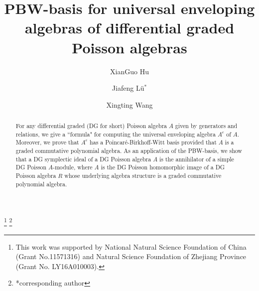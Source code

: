 \documentclass[a4paper,10pt]{amsart}
\theoremstyle{definition}
\theoremstyle{remark}
\numberwithin{equation}{section}
\begin{document}
\title{PBW-basis for universal enveloping algebras of differential graded Poisson algebras}

\author{XianGuo Hu}
\address{Department of Mathematics, Zhejiang Normal University, Jinhua, Zhejiang, 321004 P.R. China}

\author{Jiafeng L\"{u}$^*$}
\address{Department of Mathematics, Zhejiang Normal University, Jinhua, Zhejiang, 321004 P.R. China}

\author{Xingting Wang}
\address{Wang: Department of Mathematics, Temple University, Philadelphia, 19122, USA }

\thanks{This work was supported by National Natural Science Foundation of China (Grant No.11571316) and Natural
Science Foundation of Zhejiang Province (Grant No. LY16A010003).}
\thanks{*corresponding author}


\begin{abstract}
For any differential graded (DG for short) Poisson algebra $A$ given by generators
and relations, we give a ``formula" for computing the universal
enveloping algebra $A^e$ of $A$. Moreover, we prove that $A^e$ has a
Poincar\'{e}-Birkhoff-Witt basis provided that $A$ is a graded commutative polynomial
algebra. As an application of the PBW-basis, we show that a DG symplectic ideal of a DG Poisson algebra $A$ is the annihilator of a simple DG Poisson $A$-module, where $A$ is the DG Poisson homomorphic image of a DG Poisson algebra $R$ whose underlying algebra structure is a graded commutative polynomial algebra.
\end{abstract}
\maketitle

\medskip
\end{document}

